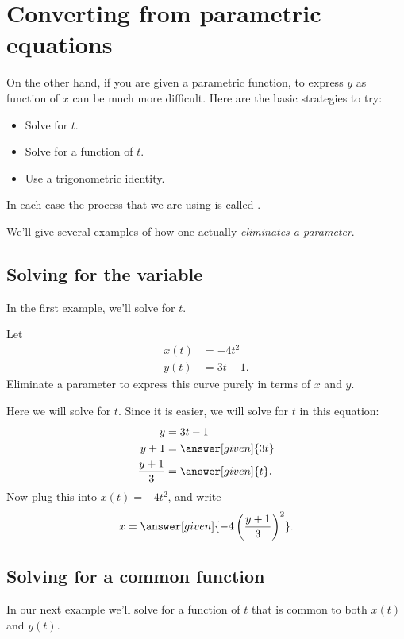 \documentclass{ximera}
\begin{document}
\section{Converting from parametric equations}

On the other hand, if you are given a parametric function, to express
$y$ as function of $x$ can be much more difficult. Here are the basic
strategies to try:
\begin{itemize}
\item Solve for $t$.
\item Solve for a function of $t$.
\item Use a trigonometric identity.
\end{itemize}
In each case the process that we are using is called
.

We'll give several examples of how one actually \textit{eliminates a
  parameter}.

\subsection{Solving for the variable}

In the first example, we'll solve for $t$.
\begin{example}
  Let
  \begin{align*}
    x(t) &= -4 t^2\\
    y(t) &= 3t-1.
  \end{align*}
    Eliminate a parameter to express this curve purely in terms of $x$ and $y$.
  \begin{explanation}
    Here we will solve for $t$. Since it is easier, we will solve for
    $t$ in this equation:
    \begin{align*}
      y &= 3t-1\\
      y+1 &= \answer[given]{3t}\\
      \frac{y+1}{3} & = \answer[given]{t}.
    \end{align*}
    Now plug this into $x(t) = -4 t^2$, and write
    \[
    x = \answer[given]{-4 \left(\frac{y+1}{3}\right)^2}.
    \]
  \end{explanation}
\end{example}

\subsection{Solving for a common function}

In our next example we'll solve for a function of $t$ that is common
to both $x(t)$ and $y(t)$.
\end{document}
